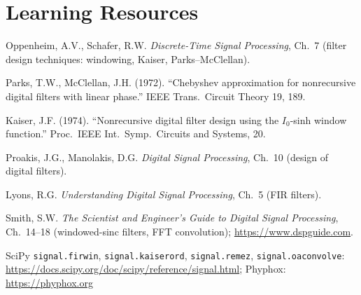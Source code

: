 \documentclass[11pt,a4paper]{article}
\begin{document}
\section*{Learning Resources}
\begin{resources}
  \item Oppenheim, A.V., Schafer, R.W. \emph{Discrete-Time Signal Processing}, Ch.~7 (filter design techniques: windowing, Kaiser, Parks--McClellan).
  \item Parks, T.W., McClellan, J.H. (1972). ``Chebyshev approximation for nonrecursive digital filters with linear phase.'' IEEE Trans.\ Circuit Theory 19, 189.
  \item Kaiser, J.F. (1974). ``Nonrecursive digital filter design using the $I_0$-sinh window function.'' Proc.\ IEEE Int.\ Symp.\ Circuits and Systems, 20.
  \item Proakis, J.G., Manolakis, D.G. \emph{Digital Signal Processing}, Ch.~10 (design of digital filters).
\end{resources}
\begin{resources}
  \item Lyons, R.G. \emph{Understanding Digital Signal Processing}, Ch.~5 (FIR filters).
  \item Smith, S.W. \emph{The Scientist and Engineer's Guide to Digital Signal Processing}, Ch.~14--18 (windowed-sinc filters, FFT convolution); \url{https://www.dspguide.com}.
\end{resources}
\begin{resources}
  \item SciPy \texttt{signal.firwin}, \texttt{signal.kaiserord}, \texttt{signal.remez}, \texttt{signal.oaconvolve}: \url{https://docs.scipy.org/doc/scipy/reference/signal.html}; Phyphox: \url{https://phyphox.org}
\end{resources}

\evaluation
\end{document}
